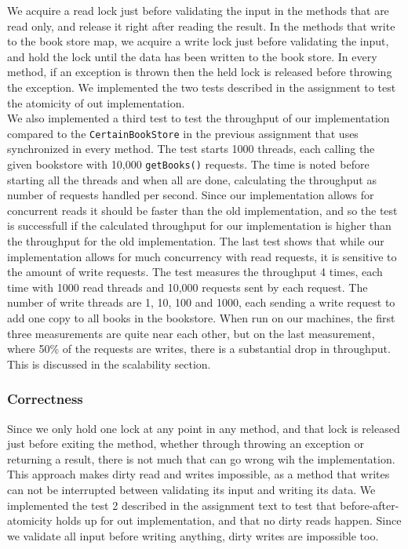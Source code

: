 \documentclass{article}
\theoremstyle{plain}
\theoremstyle{nonumberplain}
\begin{document}
We acquire a read lock just before validating the input in the methods that are read only, and release it right after reading the result. In the methods that write to the book store map, we acquire a write lock just before validating the input, and hold the lock until the data has been written to the book store. In every method, if an exception is thrown then the held lock is released before throwing the exception. We implemented the two tests described in the assignment to test the atomicity of out implementation. \\
We also implemented a third test to test the throughput of our implementation compared to the \verb|CertainBookStore| in the previous assignment that uses synchronized in every method. The test starts 1000 threads, each calling the given bookstore with 10,000 \verb|getBooks()| requests. The time is noted before starting all the threads and when all are done, calculating the throughput as number of requests handled per second. Since our implementation allows for concurrent reads it should be faster than the old implementation, and so the test is successfull if the calculated throughput for our implementation is higher than the throughput for the old implementation.
The last test shows that while our implementation allows for much concurrency with read requests, it is sensitive to the amount of write requests. The test measures the throughput 4 times, each time with 1000 read threads and 10,000 requests sent by each request. The number of write threads are 1, 10, 100 and 1000, each sending a write request to add one copy to all books in the bookstore. When run on our machines, the first three measurements are quite near each other, but on the last measurement, where 50\% of the requests are writes, there is a substantial drop in throughput. This is discussed in the scalability section.

\subsubsection{Correctness}

Since we only hold one lock at any point in any method, and that lock is released just before exiting the method, whether through throwing an exception or returning a result, there is not much that can go wrong wih the implementation. This approach makes dirty read and writes impossible, as a method that writes can not be interrupted between validating its input and writing its data. We implemented the test  2 described in the assignment text to test that before-after-atomicity holds up for out implementation, and that no dirty reads happen. Since we validate all input before writing anything, dirty writes are impossible too.
\end{document}
